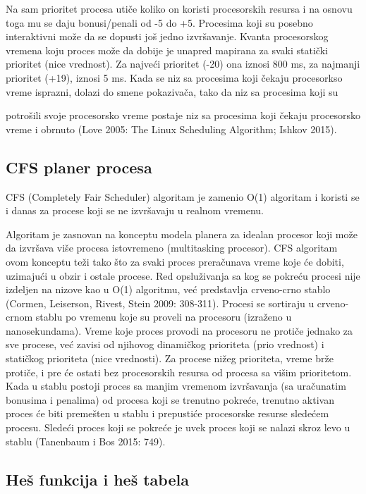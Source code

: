 Na sam prioritet procesa utiče koliko on koristi procesorskih resursa i na osnovu toga mu se
daju bonusi/penali od -5 do +5. Procesima koji su posebno interaktivni može da se dopusti
još jedno izvršavanje. Kvanta procesorskog vremena koju proces može da dobije je unapred
mapirana za svaki statički prioritet (nice vrednost). Za najveći prioritet (-20) ona iznosi 800
ms, za najmanji prioritet (+19), iznosi 5 ms. Kada se niz sa procesima koji čekaju
procesorkso vreme isprazni, dolazi do smene pokazivača, tako da niz sa procesima koji su

potrošili svoje procesorsko vreme postaje niz sa procesima koji čekaju procesorsko vreme i
obrnuto (Love 2005: The Linux Scheduling Algorithm; Ishkov 2015).

\subsection{CFS planer procesa}

CFS (Completely Fair Scheduler) algoritam je zamenio O(1) algoritam i koristi se i danas za
procese koji se ne izvršavaju u realnom vremenu.

Algoritam je zasnovan na konceptu modela planera za idealan procesor koji može da izvršava
više procesa istovremeno (multitasking procesor). CFS algoritam ovom konceptu teži tako
što za svaki proces preračunava vreme koje će dobiti, uzimajući u obzir i ostale procese.
Red opsluživanja sa kog se pokreću procesi nije izdeljen na nizove kao u O(1) algoritmu, već
predstavlja crveno-crno stablo (Cormen, Leiserson, Rivest, Stein 2009: 308-311). Procesi se
sortiraju u crveno-crnom stablu po vremenu koje su proveli na procesoru (izraženo u
nanosekundama). Vreme koje proces provodi na procesoru ne protiče jednako za sve procese,
već zavisi od njihovog dinamičkog prioriteta (prio vrednost) i statičkog prioriteta (nice
vrednosti). Za procese nižeg prioriteta, vreme brže protiče, i pre će ostati bez procesorskih
resursa od procesa sa višim prioritetom. Kada u stablu postoji proces sa manjim vremenom
izvršavanja (sa uračunatim bonusima i penalima) od procesa koji se trenutno pokreće,
trenutno aktivan proces će biti premešten u stablu i prepustiće procesorske resurse sledećem
procesu. Sledeći proces koji se pokreće je uvek proces koji se nalazi skroz levo u stablu
(Tanenbaum i Bos 2015: 749).

\subsection{Heš funkcija i heš tabela}

